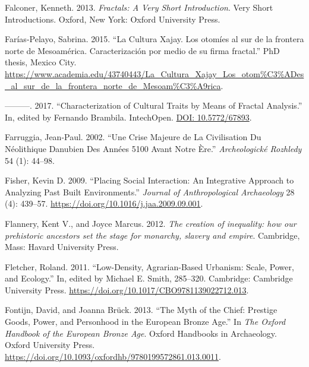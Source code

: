 \documentclass[
  12pt,
  a4paper, twoside]{book}
\newlength{\cslhangindent}
\newlength{\cslentryspacingunit} %
\newenvironment{CSLReferences}[2] %
 {%
  \setlength{\parindent}{0pt}
  \ifodd #1
  \let\oldpar\par
  \def\par{\hangindent=\cslhangindent\oldpar}
  \fi
  \setlength{\parskip}{#2\cslentryspacingunit}
 }%
 {}
\begin{document}
\begin{CSLReferences}{1}{0}
\leavevmode{}%
Falconer, Kenneth. 2013. \emph{Fractals: A Very Short Introduction}. Very Short Introductions. Oxford, New York: Oxford University Press.

\leavevmode{}%
Farías-Pelayo, Sabrina. 2015. {``La Cultura Xajay. Los otomíes al sur de la frontera norte de Mesoamérica. Caracterización por medio de su firma fractal.''} PhD thesis, Mexico City. \url{https://www.academia.edu/43740443/La_Cultura_Xajay_Los_otom\%C3\%ADes_al_sur_de_la_frontera_norte_de_Mesoam\%C3\%A9rica}.

\leavevmode{}%
---------. 2017. {``Characterization of Cultural Traits by Means of Fractal Analysis.''} In, edited by Fernando Brambila. IntechOpen. \href{https://DOI:\%2010.5772/67893}{DOI: 10.5772/67893}.

\leavevmode{}%
Farruggia, Jean-Paul. 2002. {``Une Crise Majeure de La Civilisation Du Néolithique Danubien Des Années 5100 Avant Notre Ère.''} \emph{Archeologické Rozhledy} 54 (1): 44--98.

\leavevmode{}%
Fisher, Kevin D. 2009. {``Placing Social Interaction: An Integrative Approach to Analyzing Past Built Environments.''} \emph{Journal of Anthropological Archaeology} 28 (4): 439--57. \url{https://doi.org/10.1016/j.jaa.2009.09.001}.

\leavevmode{}%
Flannery, Kent V., and Joyce Marcus. 2012. \emph{The creation of inequality: how our prehistoric ancestors set the stage for monarchy, slavery and empire}. Cambridge, Mass: Havard University Press.

\leavevmode{}%
Fletcher, Roland. 2011. {``Low-Density, Agrarian-Based Urbanism: Scale, Power, and Ecology.''} In, edited by Michael E. Smith, 285--320. Cambridge: Cambridge University Press. \url{https://doi.org/10.1017/CBO9781139022712.013}.

\leavevmode{}%
Fontijn, David, and Joanna Brück. 2013. {``The {Myth} of the {Chief}: {Prestige Goods}, {Power}, and {Personhood} in the {European Bronze Age}.''} In \emph{The {Oxford Handbook} of the {European Bronze Age}}. Oxford {Handbooks} in {Archaeology}. {Oxford University Press}. \url{https://doi.org/10.1093/oxfordhb/9780199572861.013.0011}.


\end{CSLReferences}
\end{document}

